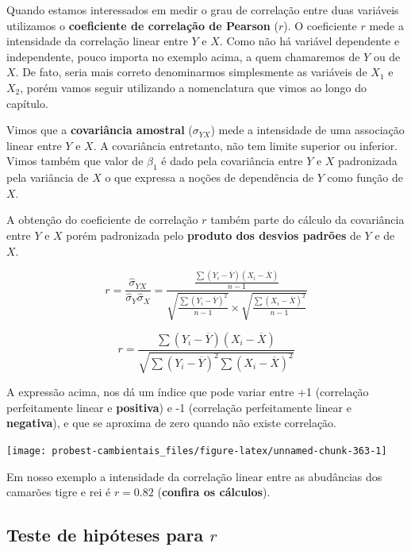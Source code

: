 \documentclass[
]{book}
\begin{document}
Quando estamos interessados em medir o grau de correlação entre duas variáveis utilizamos o \textbf{coeficiente de correlação de Pearson} (\textbf{\(r\)}). O coeficiente \(r\) mede a intensidade da correlação linear entre \(Y\) e \(X\). Como não há variável dependente e independente, pouco importa no exemplo acima, a quem chamaremos de \(Y\) ou de \(X\). De fato, seria mais correto denominarmos simplesmente as variáveis de \(X_1\) e \(X_2\), porém vamos seguir utilizando a nomenclatura que vimos ao longo do capítulo.

Vimos que a \textbf{covariância amostral} (\(\sigma_{YX}\)) mede a intensidade de uma associação linear entre \(Y\) e \(X\). A covariância entretanto, não tem limite superior ou inferior. Vimos também que valor de \(\beta_1\) é dado pela covariância entre \(Y\) e \(X\) padronizada pela variância de \(X\) o que expressa a noções de dependência de \(Y\) como função de \(X\).

A obtenção do coeficiente de correlação \(r\) também parte do cálculo da covariância entre \(Y\) e \(X\) porém padronizada pelo \textbf{produto dos desvios padrões} de \(Y\) e de \(X\).

\[r = \frac{\hat{\sigma}_{YX}}{\hat{\sigma}_Y \hat{\sigma}_X} = 
\frac{\frac{\sum{(Y_i - \overline{Y})(X_i - \overline{X})}}{n-1}}
{\sqrt{\frac{\sum{(Y_i - \overline{Y})^2}}{n-1}}  \times 
\sqrt{\frac{\sum{(X_i - \overline{X})^2}}{n-1}}}\]

\[r = \frac{\sum{(Y_i - \overline{Y})(X_i - \overline{X})}}{\sqrt{\sum{(Y_i - \overline{Y})^2 \sum{(X_i - \overline{X})^2}}}}\]

A expressão acima, nos dá um índice que pode variar entre +1 (correlação perfeitamente linear e \textbf{positiva}) e -1 (correlação perfeitamente linear e \textbf{negativa}), e que se aproxima de zero quando não existe correlação.

\begin{center}\texttt{[image: probest-cambientais\_files/figure-latex/unnamed-chunk-363-1]} \end{center}

Em nosso exemplo a intensidade da correlação linear entre as abudâncias dos camarões tigre e rei é \(r = 0.82\) (\textbf{confira os cálculos}).

\hypertarget{teste-de-hipuxf3teses-para-r}{%
\subsection{\texorpdfstring{Teste de hipóteses para \(r\)}{Teste de hipóteses para r}}\label{teste-de-hipuxf3teses-para-r}}
\end{document}
